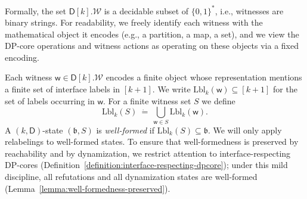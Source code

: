 \documentclass[11pt,a4paper]{article}
\newcommand{\treewidthvalue}{k}
\newcommand{\abag}{\mathfrak{b}}
\newcommand{\defeq}{~\dot{=}~}
\newcommand{\allwitnesses}{\mathcal{W}}
\newcommand{\awitness}{\mathsf{w}}
\newcommand{\dpcore}{\mathsf{D}}
\newcommand{\witnessset}{S}
\begin{document}
Formally, the set $\dpcore[\treewidthvalue].\allwitnesses$ is a decidable subset of $\{0,1\}^\ast$, i.e., witnesses are binary strings. For readability, we freely identify each witness with the mathematical object it encodes (e.g., a partition, a map, a set), and we view the DP-core operations and witness actions as operating on these objects via a fixed encoding.

Each witness $\awitness\in \dpcore[\treewidthvalue].\allwitnesses$ encodes a finite object whose representation mentions a finite set of interface labels in $[\treewidthvalue+1]$.
We write $\mathrm{Lbl}_{\treewidthvalue}(\awitness)\subseteq [\treewidthvalue+1]$ for the set of labels occurring in $\awitness$.
For a finite witness set $\witnessset$ we define
\[
\mathrm{Lbl}_{\treewidthvalue}(\witnessset)\defeq \bigcup_{\awitness\in \witnessset}\mathrm{Lbl}_{\treewidthvalue}(\awitness).
\]
A $(\treewidthvalue,\dpcore)$-state $(\abag,\witnessset)$ is \emph{well-formed} if $\mathrm{Lbl}_{\treewidthvalue}(\witnessset)\subseteq \abag$.
We will only apply relabelings to well-formed states.
To ensure that well-formedness is preserved by reachability and by dynamization, we restrict attention to interface-respecting DP-cores (Definition~\ref{definition:interface-respecting-dpcore}); under this mild discipline, all refutations and all dynamization states are well-formed (Lemma~\ref{lemma:well-formedness-preserved}).
\end{document}
